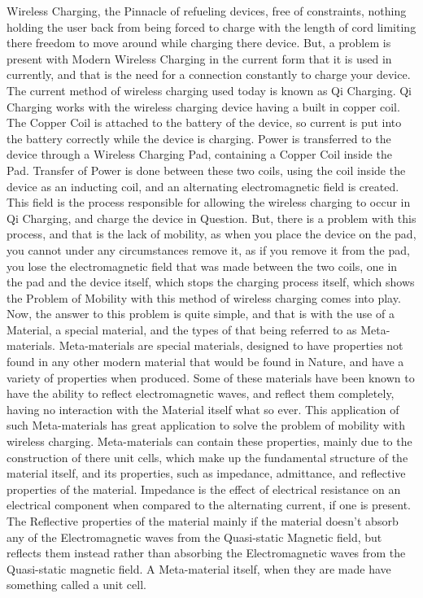 \documentclass[]{article}
\begin{document}
Wireless Charging, the Pinnacle of refueling devices, free of constraints, nothing holding the user back from being forced to charge with the length of cord limiting there freedom to move around while charging there device. But, a problem is present with Modern Wireless Charging in the current form that it is used in currently, and that is the need for a connection constantly to charge your device. The current method of wireless charging used today is known as Qi Charging. Qi Charging works with the wireless charging device having a built in copper coil. The Copper Coil is attached to the battery of the device, so current is put into the battery correctly while the device is charging. Power is transferred to the device through a Wireless Charging Pad, containing a Copper Coil inside the Pad. Transfer of Power is done between these two coils, using the coil inside the device as an inducting coil, and an alternating electromagnetic field is created. This field is the process responsible for allowing the wireless charging to occur in Qi Charging, and charge the device in Question. But, there is a problem with this process, and that is the lack of mobility, as when you place the device on the pad, you cannot under any circumstances remove it, as if you remove it from the pad, you lose the electromagnetic field that was made between the two coils, one in the pad and the device itself, which stops the charging process itself, which shows the Problem of Mobility with this method of wireless charging comes into play. Now, the answer to this problem is quite simple, and that is with the use of a Material, a special material, and the types of that being referred to as Meta-materials. Meta-materials are special materials, designed to have properties not found in any other modern material that would be found in Nature, and have a variety of properties when produced. Some of these materials have been known to have the ability to reflect electromagnetic waves, and reflect them completely, having no interaction with the Material itself what so ever. This application of such Meta-materials has great application to solve the problem of mobility with wireless charging. Meta-materials can contain these properties, mainly due to the construction of there unit cells, which make up the fundamental structure of the material itself, and its properties, such as impedance, admittance, and reflective properties of the material. Impedance is the effect of electrical resistance on an electrical component when compared to the alternating current, if one is present. The Reflective properties of the material mainly if the material doesn't absorb any of the Electromagnetic waves from the Quasi-static Magnetic field, but reflects them instead rather than absorbing the Electromagnetic waves from the Quasi-static magnetic field. A Meta-material itself, when they are made have something called a unit cell.
\end{document}
